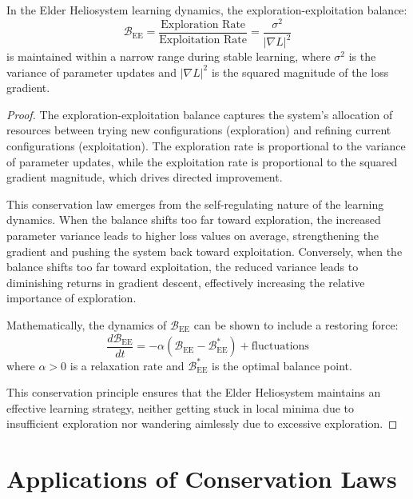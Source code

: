 \begin{theorem}
In the Elder Heliosystem learning dynamics, the exploration-exploitation balance:
\begin{equation}
\mathcal{B}_{\text{EE}} = \frac{\text{Exploration Rate}}{\text{Exploitation Rate}} = \frac{\sigma^2}{|\nabla L|^2}
\end{equation}
is maintained within a narrow range during stable learning, where $\sigma^2$ is the variance of parameter updates and $|\nabla L|^2$ is the squared magnitude of the loss gradient.
\end{theorem}

\begin{proof}
The exploration-exploitation balance captures the system's allocation of resources between trying new configurations (exploration) and refining current configurations (exploitation). The exploration rate is proportional to the variance of parameter updates, while the exploitation rate is proportional to the squared gradient magnitude, which drives directed improvement.

This conservation law emerges from the self-regulating nature of the learning dynamics. When the balance shifts too far toward exploration, the increased parameter variance leads to higher loss values on average, strengthening the gradient and pushing the system back toward exploitation. Conversely, when the balance shifts too far toward exploitation, the reduced variance leads to diminishing returns in gradient descent, effectively increasing the relative importance of exploration.

Mathematically, the dynamics of $\mathcal{B}_{\text{EE}}$ can be shown to include a restoring force:
\begin{equation}
\frac{d\mathcal{B}_{\text{EE}}}{dt} = -\alpha(\mathcal{B}_{\text{EE}} - \mathcal{B}_{\text{EE}}^*) + \text{fluctuations}
\end{equation}
where $\alpha > 0$ is a relaxation rate and $\mathcal{B}_{\text{EE}}^*$ is the optimal balance point.

This conservation principle ensures that the Elder Heliosystem maintains an effective learning strategy, neither getting stuck in local minima due to insufficient exploration nor wandering aimlessly due to excessive exploration.
\end{proof}

\section{Applications of Conservation Laws}

